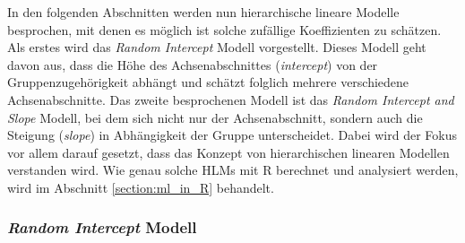 \documentclass[12pt]{article}\usepackage[]{graphicx}\usepackage[]{color}
\begin{document}
In den folgenden Abschnitten werden nun hierarchische lineare Modelle besprochen, mit denen es möglich ist solche zufällige Koeffizienten zu schätzen. Als erstes wird das \textit{Random Intercept} Modell vorgestellt. Dieses Modell geht davon aus, dass die Höhe des Achsenabschnittes (\textit{intercept}) von der Gruppenzugehörigkeit abhängt und schätzt folglich mehrere verschiedene Achsenabschnitte. Das zweite besprochenen Modell ist das \textit{Random Intercept and Slope} Modell, bei dem sich nicht nur der Achsenabschnitt, sondern auch die Steigung (\textit{slope}) in Abhängigkeit der Gruppe unterscheidet. Dabei wird der Fokus vor allem darauf gesetzt, dass das Konzept von hierarchischen linearen Modellen verstanden wird. Wie genau solche HLMs mit R berechnet und analysiert werden, wird im Abschnitt \ref{section:ml_in_R} behandelt. 

\subsubsection{\textit{Random Intercept} Modell} \label{section:random_intercept_model}
\end{document}
